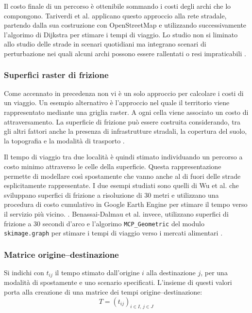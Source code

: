 Il costo finale di un percorso è ottenibile sommando i costi degli archi che lo compongono. Tariverdi et al. applicano questo approccio alla rete stradale, partendo dalla sua costruzione con OpenStreetMap e utilizzando successivamente l'algorimo di Dijkstra per stimare i tempi di viaggio. Lo studio non si liminato allo studio delle strade in scenari quotidiani ma integrano scenari di perturbazione nei quali alcuni archi possono essere rallentati o resi impraticabili \cite{tariverdi2023}.

\subsubsection{Superfici raster di frizione} 
Come accennato in precedenza non vi è un solo approccio per calcolare i costi di un viaggio. Un esempio alternativo è l'approccio nel quale il territorio viene rappresentato mediante una griglia raster. A ogni cella viene associato un costo di attraversamento.
La superficie di frizione può essere costruita considerando, tra gli altri fattori anche la presenza di infrastrutture stradali,  la copertura del suolo, la topografia e la modalità di trasporto \cite{wu2025,benassai2026}.

Il tempo di viaggio tra due località è quindi stimato individuando un percorso a costo minimo attraverso le celle della superficie. Questa rappresentazione permette di modellare così spostamente che vanno anche al di fuori delle strade esplicitamente rappresentate. %
I due esempi studiati sono quelli di Wu et al. che sviluppano superfici di frizione a risoluzione di 30 metri e utilizzano una procedura di costo cumulativo in Google Earth Engine per stimare il tempo verso il servizio più vicino. \cite{wu2025}.
Benassai-Dalmau et al. invece, utilizzano superfici di frizione a 30 secondi d'arco e l'algorimo \texttt{MCP\_Geometric} del modulo \texttt{skimage.graph} per stimare i tempi di viaggio verso i mercati alimentari \cite{benassai2026}.


\subsubsection{Matrice origine--destinazione}

Si indichi con $t_{ij}$ il tempo stimato dall'origine $i$ alla destinazione $j$, per una modalità di spostamente e uno scenario specificati.  L'insieme di questi valori porta alla creazione di una matrice dei tempi origine--destinazione:
\begin{equation}
    T=(t_{ij})_{i\in I,\,j\in J}
\end{equation}


